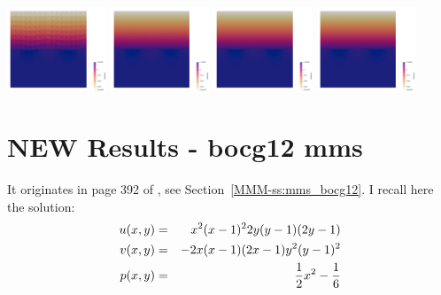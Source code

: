 \begin{center}
\includegraphics[width=2.96cm]{python_codes/fieldstone_120/paperresults/rt/structured/reduced/press_p2p0.0000.png}
\includegraphics[width=2.96cm]{python_codes/fieldstone_120/paperresults/rt/structured/reduced/press_p2p0.0002.png}
\includegraphics[width=2.96cm]{python_codes/fieldstone_120/paperresults/rt/structured/reduced/press_p2p0.0003.png}
\includegraphics[width=2.96cm]{python_codes/fieldstone_120/paperresults/rt/structured/reduced/press_p2p0.0004.png}
\end{center}








\newpage
\section*{NEW Results - bocg12 mms}

It originates in page 392 of \textcite{bocg12}, see Section~\ref{MMM-ss:mms_bocg12}.
I recall here the solution:
\begin{eqnarray}
u(x,y) &=& x^2(x-1)^2 2y(y-1)(2y-1) \nonumber\\
v(x,y) &=& -2x(x-1)(2x -1)y^2(y-1)^2  \nonumber\\
p(x,y) &=& \frac12 x^2 -\frac16 \nonumber
\end{eqnarray}

